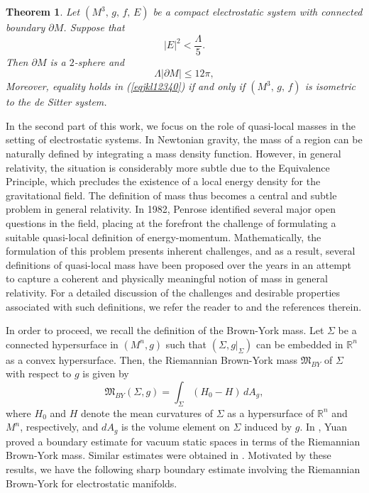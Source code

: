 \documentclass{amsart}
\newtheorem{theoremletter}{Theorem}
\numberwithin{equation}{section}
\begin{document}
\begin{theoremletter}\label{teorigidezint1}
		Let $(M^3,\, g,\, f,\, E)$ be a compact electrostatic system with connected boundary $\partial M$. Suppose that $$\vert E\vert^{2}< \dfrac{\Lambda}{5}.$$ Then $\partial M$ is a $2$-sphere and
		\begin{equation}
		\label{eqjkl12340}
			\Lambda|\partial M|\leq12\pi ,
		\end{equation}
		Moreover, equality holds in (\ref{eqjkl12340}) if and only if $(M^3,\,g,\,f)$ is isometric to the de Sitter system.
	\end{theoremletter}
	
 


In the second part of this work, we focus on the role of quasi-local masses in the setting of electrostatic systems. In Newtonian gravity, the mass of a region can be naturally defined by integrating a mass density function. However, in general relativity, the situation is considerably more subtle due to the Equivalence Principle, which precludes the existence of a local energy density for the gravitational field. The definition of mass thus becomes a central and subtle problem in general relativity. In 1982, Penrose \cite{penrose1} identified several major open questions in the field, placing at the forefront the challenge of formulating a suitable quasi-local definition of energy-momentum. Mathematically, the formulation of this problem presents inherent challenges, and as a result, several definitions of quasi-local mass have been proposed over the years in an attempt to capture a coherent and physically meaningful notion of mass in general relativity. For a detailed discussion of the challenges and desirable properties associated with such definitions, we refer the reader to \cite{alaee2023, christodoulou1986} and the references therein.


In order to proceed, we recall the definition of the  Brown-York mass. Let \(\Sigma\) be a connected hypersurface in \((M^n, g)\) such that \((\Sigma, g|_{\Sigma})\) can be embedded in \(\mathbb{R}^n\) as a convex hypersurface. Then, the Riemannian Brown-York mass \(\mathfrak{M}_{BY}\) of \(\Sigma\) with respect to \(g\) is given by
\[
\mathfrak{M}_{BY}(\Sigma, g) = \int_{\Sigma} (H_0 - H) \, dA_g,
\]
where \(H_0\) and \(H\) denote the mean curvatures of \(\Sigma\) as a hypersurface of \(\mathbb{R}^n\) and \(M^n\), respectively, and \(dA_g\) is the volume element on \(\Sigma\) induced by \(g\). In \cite{yuan}, Yuan proved a boundary estimate
for vacuum static spaces in terms of the Riemannian Brown-York mass. Similar estimates were obtained in \cite{costa,ernani}. Motivated by these results, we have the following sharp boundary estimate involving the Riemannian Brown-York for electrostatic manifolds. 
\end{document}
